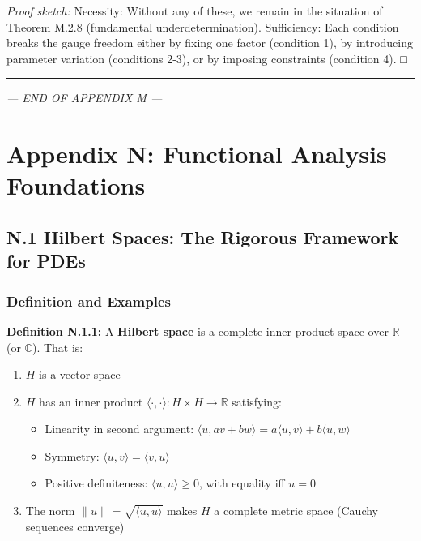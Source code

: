 \documentclass[
]{article}
\providecommand{\tightlist}{%
  \setlength{\itemsep}{0pt}\setlength{\parskip}{0pt}}
\begin{document}
\emph{Proof sketch:} Necessity: Without any of these, we remain in the
situation of Theorem M.2.8 (fundamental underdetermination).
Sufficiency: Each condition breaks the gauge freedom either by fixing
one factor (condition 1), by introducing parameter variation (conditions
2-3), or by imposing constraints (condition 4). □

\begin{center}\rule{0.5\linewidth}{0.5pt}\end{center}

\emph{--- END OF APPENDIX M ---}

\newpage

\section{Appendix N: Functional Analysis
Foundations}\label{appendix-n-functional-analysis-foundations}

\subsection{N.1 Hilbert Spaces: The Rigorous Framework for
PDEs}\label{n.1-hilbert-spaces-the-rigorous-framework-for-pdes}

\subsubsection{Definition and Examples}\label{definition-and-examples}

\textbf{Definition N.1.1:} A \textbf{Hilbert space} is a complete inner
product space over \(\mathbb{R}\) (or \(\mathbb{C}\)). That is:

\begin{enumerate}
\def\labelenumi{\arabic{enumi}.}
\tightlist
\item
  \(H\) is a vector space
\item
  \(H\) has an inner product
  \(\langle \cdot, \cdot \rangle: H \times H \to \mathbb{R}\)
  satisfying:

  \begin{itemize}
  \tightlist
  \item
    Linearity in second argument:
    \(\langle u, av + bw \rangle = a\langle u, v \rangle + b\langle u, w \rangle\)
  \item
    Symmetry: \(\langle u, v \rangle = \langle v, u \rangle\)
  \item
    Positive definiteness: \(\langle u, u \rangle \geq 0\), with
    equality iff \(u = 0\)
  \end{itemize}
\item
  The norm \(\|u\| = \sqrt{\langle u, u \rangle}\) makes \(H\) a
  complete metric space (Cauchy sequences converge)
\end{enumerate}
\end{document}
